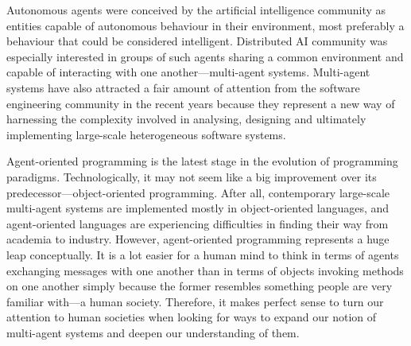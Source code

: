 


Autonomous agents were conceived by the artificial intelligence community as entities capable of autonomous behaviour in their environment, most preferably a behaviour that could be considered intelligent.
Distributed AI community was especially interested in groups of such agents sharing a common environment and capable of interacting with one another---multi-agent systems.
Multi-agent systems have also attracted a fair amount of attention from the software engineering community in the recent years because they represent a new way of harnessing the complexity involved in analysing, designing and ultimately implementing large-scale heterogeneous software systems.
 
Agent-oriented programming is the latest stage in the evolution of programming paradigms.
Technologically, it may not seem like a big improvement over its predecessor---object-oriented programming.
After all, contemporary large-scale multi-agent systems are implemented mostly in object-oriented languages, and agent-oriented languages are experiencing difficulties in finding their way from academia to industry.
However, agent-oriented programming represents a huge leap conceptually.
It is a lot easier for a human mind to think in terms of agents exchanging messages with one another than in terms of objects invoking methods on one another simply because the former resembles something people are very familiar with---a human society.
Therefore, it makes perfect sense to turn our attention to human societies when looking for ways to expand our notion of multi-agent systems and deepen our understanding of them.

